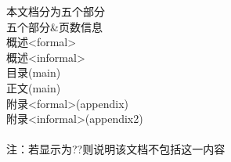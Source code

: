 本文档分为五个部分\\
五个部分\&页数信息\\
概述<formal>\pageref{abstractformal}\\
概述<informal>\pageref{abstractinformal}\\
目录(main)\pageref{contents}\\
正文(main)\pageref{main}\\
附录<formal>(appendix)\pageref{appendixformal}\\
附录<informal>(appendix2)\pageref{appendix}\\
\\
注：若显示为??则说明该文档不包括这一内容\label{appendixformal} \\
\\ 